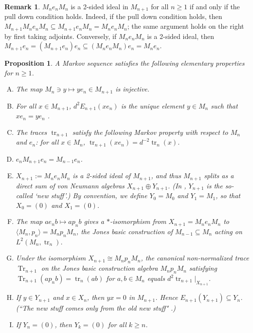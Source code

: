 \documentclass[11pt]{article}
\theoremstyle{plain}
\newtheorem{prop}[thm]{Proposition}
\theoremstyle{definition}
\newtheorem{rem}[thm]{Remark}
\DeclareMathOperator{\Tr}{Tr}
\DeclareMathOperator{\tr}{tr}
\begin{document}
\begin{rem}
$M_n e_n M_n$ is a 2-sided ideal in $M_{n+1}$ for all $n\geq 1$ if and only if the pull down condition holds. Indeed, if the pull down condition holds, then $M_{n+1} M_n e_n M_n \subseteq M_{n+1} e_n M_n = M_n e_n M_n$; the same argument holds on the right by first taking adjoints. Conversely, if $M_n e_n M_n$ is a 2-sided ideal, then $M_{n+1} e_n = (M_{n+1} e_n)e_n \subseteq (M_n e_n M_n) e_n = M_n e_n$.
\end{rem}




\begin{prop}\label{prop:ElementaryMarkov} A Markov sequence satisfies the following elementary properties for $n\geq 1$.
\begin{enumerate}[(A)]
\item
\label{EP:Injective}
The map $M_{n}\ni y\mapsto ye_n \in M_{n+1}$ is injective.

\item
\label{EP:UniquePullDown}
For all $x\in M_{n+1}$, $d^{2}E_{n+1}(x e_n)$ is the unique element $y\in M_n$ such that $x e_n = ye_n$ \cite[Lem.~1.2]{MR860811}.

\item
\label{EP:MarkovTraces}
The traces $\tr_{n+1}$ satisfy the following \emph{Markov property} with respect to $M_n$ and $e_n$: for all $x\in M_n$, $\tr_{n+1}(xe_n) = d^{-2} \tr_n(x)$.

\item
\label{EP:CompressM_{n+1}}
$e_n M_{n+1}e_n = M_{n-1}e_n$.

\item
\label{EP:2SidedIdeal}
$X_{n+1}:=M_n e_n M_n$ is a 2-sided ideal of $M_{n+1}$, and thus $M_{n+1}$ splits as a direct sum of von Neumann algebras $X_{n+1}\oplus Y_{n+1}$.
(In \cite[Thm.~4.1.4 and Thm.~4.6.3]{MR999799}, $Y_{n+1}$ is the so-called `new stuff'.)
By convention, we define $Y_0 = M_0$ and $Y_1 = M_1$, so that $X_0 = (0)$ and $X_1 = (0)$.

\item
\label{EP:BasicContruction}
The map $ae_n b\mapsto ap_n b$ gives a $*$-isomorphism from $X_{n+1}=M_n e_n M_n$ to $\langle M_n , p_n\rangle=M_np_nM_n$, the Jones basic construction of $M_{n-1} \subseteq M_n$ acting on $L^2(M_n,\tr_n)$.

\item
\label{EP:OtherMarkovDef}
Under the isomorphism $X_{n+1} \cong M_n p_n M_n$, the canonical non-normalized trace $\Tr_{n+1}$ on the Jones basic construction algebra $M_np_nM_n$ satisfying $\Tr_{n+1}(ap_nb) = \tr_n(ab)$ for $a,b\in M_n$ equals $d^2 \tr_{n+1}|_{X_{n+1}}$.

\item
\label{EP:NewStuff}
If $y\in Y_{n+1}$ and $x\in X_{n}$, then $yx = 0$ in $M_{n+1}$.
Hence $E_{n+1}(Y_{n+1}) \subseteq Y_{n}$.
(``The new stuff comes only from the old new stuff" \cite{MR999799}.)

\item
\label{EP:FiniteDepth}
If $Y_n =(0)$, then $Y_{k} = (0)$ for all $k\geq n$.

\end{enumerate}
\end{prop}
\end{document}

